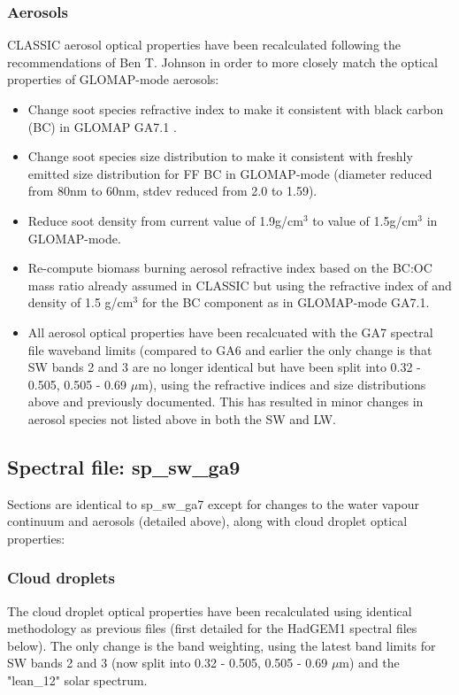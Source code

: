 \subsubsection*{Aerosols}
 
CLASSIC aerosol optical properties have been recalculated following the recommendations of Ben T. Johnson in order to more closely match the optical properties of GLOMAP-mode aerosols:
\begin{itemize}
\item Change soot species refractive index to make it consistent with black carbon (BC) in GLOMAP GA7.1 \citep{Bond06}.
\item Change soot species size distribution to make it consistent with freshly emitted size distribution for FF BC in GLOMAP-mode (diameter reduced from 80nm to 60nm, stdev reduced from 2.0 to 1.59).
\item Reduce soot density from current value of 1.9g/cm$^3$ to value of 1.5g/cm$^3$ in GLOMAP-mode.
\item Re-compute biomass burning aerosol refractive index based on the BC:OC mass ratio already assumed in CLASSIC but using the refractive index of \cite{Bond06} and density of 1.5 g/cm$^3$ for the BC component as in GLOMAP-mode GA7.1.
\item All aerosol optical properties have been recalcuated with the GA7 spectral file waveband limits (compared to GA6 and earlier the only change is that SW bands 2 and 3 are no longer identical but have been split into 0.32 - 0.505, 0.505 - 0.69 $\mu$m), using the refractive indices and size distributions above and previously documented. This has resulted in minor changes in aerosol species not listed above in both the SW and LW.
\end{itemize}

\subsection*{Spectral file: sp\_sw\_ga9}

Sections are identical to sp\_sw\_ga7 except for changes to the water vapour continuum and aerosols (detailed above), along with cloud droplet optical properties:

\subsubsection*{Cloud droplets}

The cloud droplet optical properties have been recalculated using identical methodology as previous files (first detailed for the HadGEM1 spectral files below). The only change is the band weighting, using the latest band limits for SW bands 2 and 3 (now split into 0.32 - 0.505, 0.505 - 0.69 $\mu$m) and the "lean\_12" solar spectrum.

